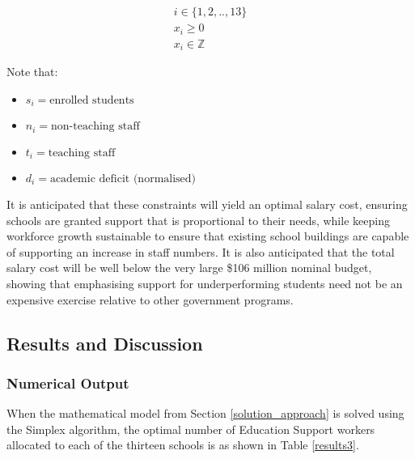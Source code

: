 \documentclass[11pt, a4paper]{article}
\begin{document}
    \begin{gather}
        i \in \{1, 2, .., 13\} \\
        x_i \geq 0 \\
        x_i \in \mathbb{Z}            
    \end{gather}

    Note that:

    \begin{itemize}
        \item $s_i = \textrm{enrolled students}$
        \item $n_i = \textrm{non-teaching staff}$
        \item $t_i = \textrm{teaching staff}$
        \item $d_i = \textrm{academic deficit (normalised)}$
    \end{itemize}

    It is anticipated that these constraints will yield an optimal salary cost, ensuring schools are granted support that is proportional to their needs, while keeping workforce growth sustainable to ensure that existing school buildings are capable of supporting an increase in staff numbers. It is also anticipated that the total salary cost will be well below the very large \$106 million nominal budget, showing that emphasising support for underperforming students need not be an expensive exercise relative to other government programs.

    \subsection{Results and Discussion}

    \subsubsection{Numerical Output}

    When the mathematical model from Section \ref{solution_approach} is solved using the Simplex algorithm, the optimal number of Education Support workers allocated to each of the thirteen schools is as shown in Table \ref{results3}.
\end{document}
